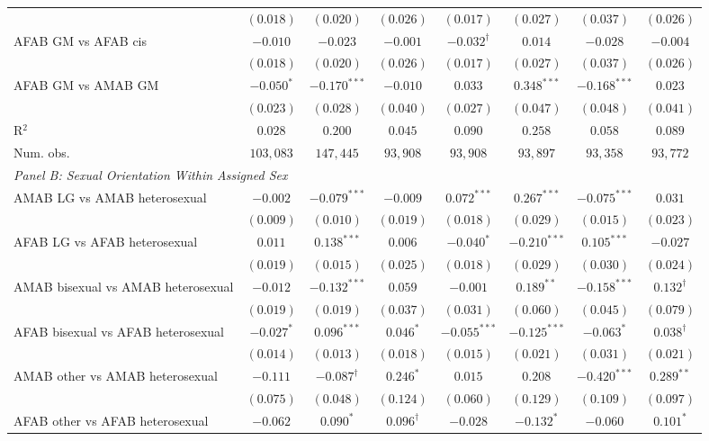 \begin{table}[htpb!]
{\begin{tabular}{l c c c c c c c}
 & $(0.018)$ & $(0.020)$ & $(0.026)$ & $(0.017)$ & $(0.027)$ & $(0.037)$ & $(0.026)$ \\
AFAB GM vs AFAB cis & $-0.010$ & $-0.023$ & $-0.001$ & $-0.032^{\dagger}$ & $0.014$ & $-0.028$ & $-0.004$ \\
 & $(0.018)$ & $(0.020)$ & $(0.026)$ & $(0.017)$ & $(0.027)$ & $(0.037)$ & $(0.026)$ \\
AFAB GM vs AMAB GM & $-0.050^{*}$ & $-0.170^{***}$ & $-0.010$ & $0.033$ & $0.348^{***}$ & $-0.168^{***}$ & $0.023$ \\
 & $(0.023)$ & $(0.028)$ & $(0.040)$ & $(0.027)$ & $(0.047)$ & $(0.048)$ & $(0.041)$ \\
\hline
R$^2$ & $0.028$ & $0.200$ & $0.045$ & $0.090$ & $0.258$ & $0.058$ & $0.089$ \\
Num. obs. & $103,083$ & $147,445$ & $93,908$ & $93,908$ & $93,897$ & $93,358$ & $93,772$ \\
\hline
\multicolumn{8}{l}{\textit{Panel B: Sexual Orientation Within Assigned Sex}} \\
AMAB LG vs AMAB heterosexual & $-0.002$ & $-0.079^{***}$ & $-0.009$ & $0.072^{***}$ & $0.267^{***}$ & $-0.075^{***}$ & $0.031$ \\
 & $(0.009)$ & $(0.010)$ & $(0.019)$ & $(0.018)$ & $(0.029)$ & $(0.015)$ & $(0.023)$ \\
AFAB LG vs AFAB heterosexual & $0.011$ & $0.138^{***}$ & $0.006$ & $-0.040^{*}$ & $-0.210^{***}$ & $0.105^{***}$ & $-0.027$ \\
 & $(0.019)$ & $(0.015)$ & $(0.025)$ & $(0.018)$ & $(0.029)$ & $(0.030)$ & $(0.024)$ \\
AMAB bisexual vs AMAB heterosexual & $-0.012$ & $-0.132^{***}$ & $0.059$ & $-0.001$ & $0.189^{**}$ & $-0.158^{***}$ & $0.132^{\dagger}$ \\
 & $(0.019)$ & $(0.019)$ & $(0.037)$ & $(0.031)$ & $(0.060)$ & $(0.045)$ & $(0.079)$ \\
AFAB bisexual vs AFAB heterosexual & $-0.027^{*}$ & $0.096^{***}$ & $0.046^{*}$ & $-0.055^{***}$ & $-0.125^{***}$ & $-0.063^{*}$ & $0.038^{\dagger}$ \\
 & $(0.014)$ & $(0.013)$ & $(0.018)$ & $(0.015)$ & $(0.021)$ & $(0.031)$ & $(0.021)$ \\
AMAB other vs AMAB heterosexual & $-0.111$ & $-0.087^{\dagger}$ & $0.246^{*}$ & $0.015$ & $0.208$ & $-0.420^{***}$ & $0.289^{**}$ \\
 & $(0.075)$ & $(0.048)$ & $(0.124)$ & $(0.060)$ & $(0.129)$ & $(0.109)$ & $(0.097)$ \\
AFAB other vs AFAB heterosexual & $-0.062$ & $0.090^{*}$ & $0.096^{\dagger}$ & $-0.028$ & $-0.132^{*}$ & $-0.060$ & $0.101^{*}$ \\

\end{tabular}}
\end{table}
